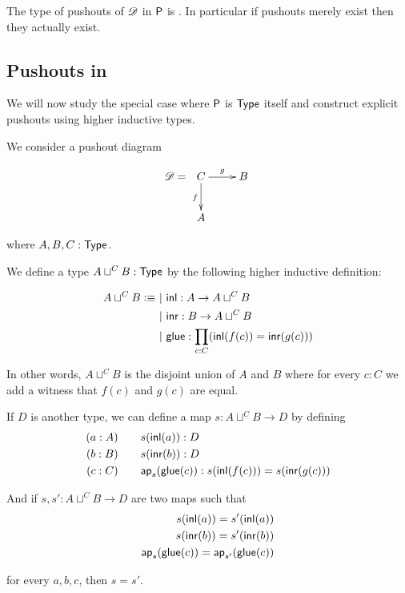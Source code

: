 \begin{cor}
  The type of pushouts of $\Ddiag$ in $\P$ is \anhprop. In particular if
  pushouts merely exist then they actually exist.
\end{cor}

\subsection{Pushouts in \type}
\label{sec:push:pushoutsintype}

We will now study the special case where $\P$ is $\type$ itself and construct
explicit pushouts using higher inductive types.

We consider a pushout diagram

\[\Ddiag=\xymatrix{C \ar^g[r] \ar_f[d] & B \\ A & }\]

where $A,B,C:\type$.

\begin{defn}
  We define a type $A\sqcup^CB:\type$ by the following higher inductive
  definition:

  \begin{align*}
    A\sqcup^CB\defeq&\ |\ \inl:A\to{}A\sqcup^CB \\
    &\ |\ \inr : B\to{}A\sqcup^CB \\
    &\ |\ \glue : \prod_{c:C}(\inl(f(c))=\inr(g(c)))
  \end{align*}

  In other words, $A\sqcup^CB$ is the disjoint union of $A$ and $B$ where for
  every $c:C$ we add a witness that $f(c)$ and $g(c)$ are equal.

  If $D$ is another type, we can define a map $s:A\sqcup^CB\to{}D$ by defining
  \begin{align*}
    (a:A)\qquad& s(\inl(a)):D\\
    (b:B)\qquad& s(\inr(b)):D\\
    (c:C)\qquad& \mapfunc{s}(\glue(c)):s(\inl(f(c)))=s(\inr(g(c)))
  \end{align*}

  And if $s,s':A\sqcup^CB\to{}D$ are two maps such that
  \begin{align*}
    s(\inl(a))=s'(\inl(a))\\
    s(\inr(b))=s'(\inr(b))\\
    \mapfunc{s}(\glue(c))=\mapfunc{s'}(\glue(c))
  \end{align*}

  for every $a,b,c$, then $s=s'$.
\end{defn}

